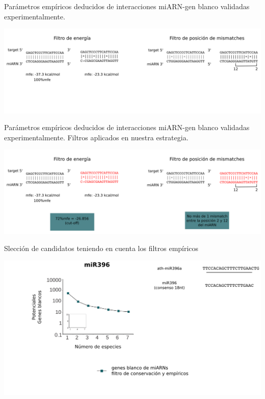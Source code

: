 \documentclass{beamer}
\begin{document}
\begin{frame}{Parámetros empíricos deducidos de interacciones miARN-gen blanco validadas experimentalmente.}
	\begin{center}
		\includegraphics[width=1\textwidth]{img/filtros_empiricos_01.png}
	\end{center}
\end{frame}

\begin{frame}{Parámetros empíricos deducidos de interacciones miARN-gen blanco validadas experimentalmente. Filtros aplicados en nuestra estrategia.}
	\begin{center}
		\includegraphics[width=1\textwidth]{img/filtros_empiricos_02.png}
	\end{center}
\end{frame}


\begin{frame}{Slección de candidatos teniendo en cuenta los filtros empíricos}
	\begin{center}
		\includegraphics[width=1\textwidth]{img/NAR_fig2_03.png}
	\end{center}
\end{frame}
\end{document}
